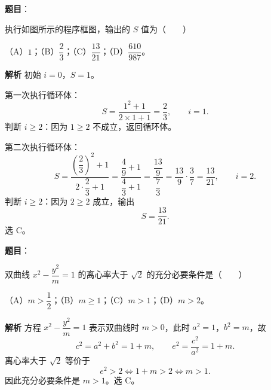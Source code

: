 \begin{answer}

\textbf{题目}：

执行如图所示的程序框图，输出的 $S$ 值为\mbox{（　　）}
\nopagebreak[4]
\begin{center}\end{center}
\nopagebreak[4]
（A）$1$；（B）$\dfrac23$；（C）$\dfrac{13}{21}$；（D）$\dfrac{610}{987}$。

\textbf{解析}
初始 $i=0$，$S=1$。

第一次执行循环体：
\nopagebreak[4]
\[S=\frac{1^2+1}{2\times1+1}=\frac23,\qquad i=1.\]
判断 $i\geqslant2$：因为 $1\geqslant2$ 不成立，返回循环体。

第二次执行循环体：
\nopagebreak[4]
\[S=\frac{\left(\dfrac23\right)^2+1}{2\cdot\dfrac23+1}
=\frac{\dfrac49+1}{\dfrac43+1}
=\frac{\dfrac{13}9}{\dfrac73}
=\frac{13}9\cdot\frac37=\frac{13}{21},\qquad i=2.\]
判断 $i\geqslant2$：因为 $2\geqslant2$ 成立，输出
\nopagebreak[4]
\[S=\frac{13}{21}.\]
选 C。


\end{answer}
\begin{answer}

\textbf{题目}：

双曲线 $x^2-\dfrac{y^2}m=1$ 的离心率大于 $\sqrt2$ 的充分必要条件是\mbox{（　　）}

（A）$m>\dfrac12$；（B）$m\geqslant1$；（C）$m>1$；（D）$m>2$。

\textbf{解析}
方程 $x^2-\dfrac{y^2}m=1$ 表示双曲线时 $m>0$，此时 $a^2=1$，$b^2=m$，故
\nopagebreak[4]
\[c^2=a^2+b^2=1+m,\qquad e^2=\frac{c^2}{a^2}=1+m.\]
离心率大于 $\sqrt2$ 等价于
\nopagebreak[4]
\[e^2>2\iff1+m>2\iff m>1.\]
因此充分必要条件是 $m>1$。选 C。


\end{answer}
